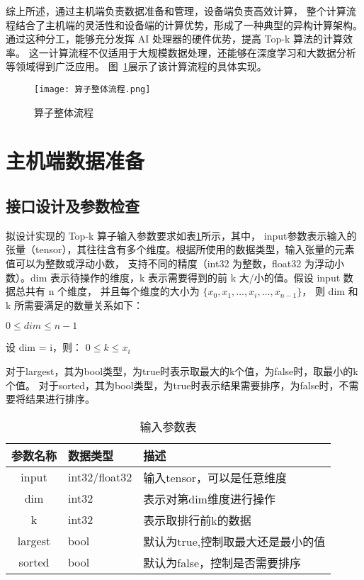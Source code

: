综上所述，通过主机端负责数据准备和管理，设备端负责高效计算，
整个计算流程结合了主机端的灵活性和设备端的计算优势，形成了一种典型的异构计算架构。
通过这种分工，能够充分发挥 AI 处理器的硬件优势，提高 Top-k 算法的计算效率。
这一计算流程不仅适用于大规模数据处理，还能够在深度学习和大数据分析等领域得到广泛应用。
图~\ref{fig:topk}展示了该计算流程的具体实现。
\begin{figure}[ht]
    \centering
    \texttt{[image: 算子整体流程.png]}
    \caption{算子整体流程}
    \label{fig:topk}
\end{figure}




\section{主机端数据准备}
    \subsection{接口设计及参数检查}
    拟设计实现的 Top-k 算子输入参数要求如表\ref{tab:input_tab}所示，其中，
    input参数表示输入的张量（tensor），其往往含有多个维度。根据所使用的数据类型，输入张量的元素值可以为整数或浮动小数，
    支持不同的精度（int32 为整数，float32 为浮动小数）。dim 表示待操作的维度，k 表示需要得到的前 k 大/小的值。假设 input 数据总共有 n 个维度，
    并且每个维度的大小为 $\{ x_{0}, x_{1}, \dots, x_{i}, \dots, x_{n-1} \}$，
    则 dim 和 k 所需要满足的数量关系如下：

    \begin{center}
        $0 \leq dim \leq n - 1$
        
        设 dim = i，则： $0 \leq k \leq x_{i}$
    \end{center}
    对于largest，其为bool类型，为true时表示取最大的k个值，为false时，取最小的k个值。
    对于sorted，其为bool类型，为true时表示结果需要排序，为false时，不需要将结果进行排序。
    \begin{table}
        \centering
        \caption{输入参数表}
        \label{tab:input_tab}
        \begin{tabular}{cll} %
          \toprule
          参数名称   & 数据类型                                       & 描述                          \\
          \midrule
          input & int32/float32 & 输入tensor，可以是任意维度                      \\
          dim & int32   & 表示对第dim维度进行操作            \\
          k   & int32   & 表示取排行前k的数据              \\
          largest & bool   & 默认为true,控制取最大还是最小的值            \\
          sorted & bool   & 默认为false，控制是否需要排序            \\
          
          \bottomrule
        \end{tabular}
    \end{table}

